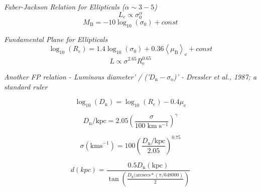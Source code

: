 \documentclass{article}
\begin{document}
\textit {Faber-Jackson Relation for Ellipticals (\(\alpha \sim 3-5\))}
\begin{equation}
L_e \propto \sigma^\alpha_\mathrm{0}
\end{equation}
\begin{equation}
M_\mathrm{B} = - 10 \log_\mathrm{10}(\sigma_\mathrm{0}) + const
\end{equation}

\textit {Fundamental Plane for Ellipticals}
\begin{equation} \label{FP}
\log_\mathrm{10}(R_e) = 1.4 \log_\mathrm{10}(\sigma_\mathrm{0}) + 0.36 \left<\mu_\mathrm{B}\right>_\mathrm{e} + const
\end{equation}
\begin{equation} 
L \propto \sigma^{2.65} R_\mathrm{e}^{0.65}
\end{equation}

\textit{Another FP relation - Luminous diameter' / ('\(D_\mathrm{n}-\sigma_\mathrm{o}\))' - Dressler et al., 1987; a standard ruler}

\begin{equation} \label{Dn}
\log_\mathrm{10}(D_\mathrm{n}) = \log_\mathrm{10}(R_e) - 0.4\mu_\mathrm{e}
\end{equation}


\begin{equation}
D_\mathrm{n}/ \mathrm{kpc} = 2.05 \left(\frac{\sigma}{100 \; \mathrm{km \; s^{-1}}}\right)^\gamma
\end{equation}
\begin{center}
\end{center}

\begin{equation}
\sigma (\mathrm{km s}^{-1}) = 100 \left( \frac{D_\mathrm{n} / \mathrm{kpc}}{2.05} \right)^{0.75}
\end{equation}



\begin{equation}
d (kpc)= \frac{0.5 D_\mathrm{n}(\mathrm{kpc})}{\tan\left( \frac{D_\mathrm{n}(\mathrm{arcsecs} * (\pi / 648000)}{2} \right)}
\end{equation}
\end{document}
